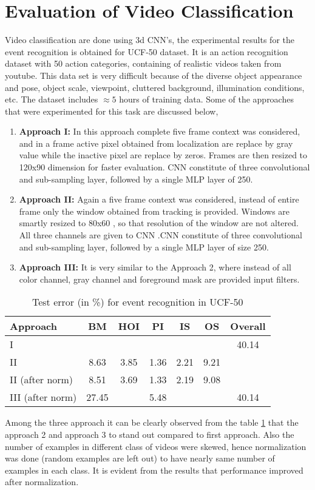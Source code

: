 \section{Evaluation of Video Classification} 
Video classification are done using 3d CNN's, the experimental results for the event recognition is obtained for UCF-50 dataset. It is an action recognition dataset with 50 action categories, containing of realistic videos taken from youtube. This data set is very difficult because of the diverse object appearance and pose, object scale, viewpoint, cluttered background, illumination conditions, etc. The dataset includes $\approx{5}$ hours of training data. Some of the approaches that were experimented for this task are discussed below,
\begin{enumerate}
	\item{\textbf{Approach I:} In this approach complete five frame context was considered, and in a frame active pixel obtained from localization are replace by gray value while the inactive pixel are replace by zeros. Frames are then resized to 120x90 dimension for faster evaluation. CNN constitute of three convolutional and sub-sampling layer,  followed by a single MLP layer of 250.}
	\item{\textbf{Approach II:} Again a five frame context was considered, instead of entire frame only the window obtained from tracking is provided.  Windows are smartly resized to 80x60 , so that resolution of the window are not altered. All three channels are given to CNN .CNN constitute of three convolutional and sub-sampling layer,  followed by a single MLP layer of size 250.}
	\item{\textbf{Approach III:} It is very similar to the Approach 2, where instead of all color channel, gray channel and foreground mask are provided input filters.}	
\end{enumerate}
\begin{table}[htbp]
   \caption{Test error (in \%) for event recognition in UCF-50}
   \begin{center}
   \begin{tabular}{|l|c|c|c|c|c|c|} \hline
        \textbf{Approach} & \textbf{BM} & \textbf{HOI} & \textbf{PI} & \textbf{IS} & \textbf{OS} & Overall \\ \hline
        I & & & & & & 40.14\\ \hline
		II & 8.63 & 3.85 & 1.36 & 2.21 & 9.21 & \\ \hline
		II (after norm) & 8.51 & 3.69 & 1.33 & 2.19 & 9.08 & \\ \hline		 
		III (after norm) & 27.45 &  & 5.48 & &  & 40.14\\ \hline
   \end{tabular}
   \label{tab:recognition}
   \medskip \small 
   \end{center}
 \end{table} 
Among the three approach it can be clearly observed from the table \ref{tab:recognition} that the approach 2 and approach 3 to stand out compared to first approach. Also the number of examples in different class of videos were skewed, hence normalization was done (random examples are left out) to have nearly same number of examples in each class. It is evident from the results that performance improved after normalization.

